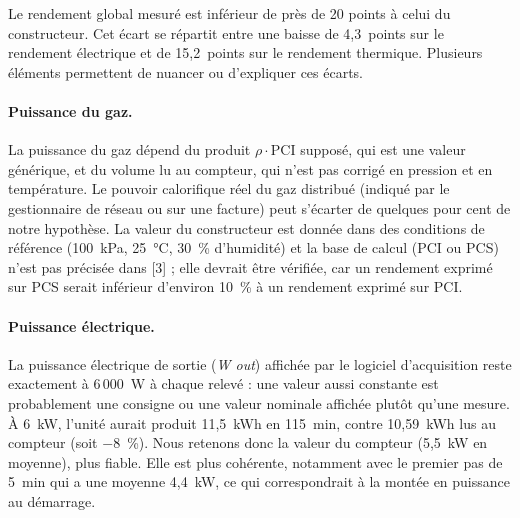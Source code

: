 Le rendement global mesuré est inférieur de près de 20 points à celui du
constructeur. Cet écart se répartit entre une baisse de 4,3~points sur
le rendement électrique et de 15,2~points sur le rendement thermique.
Plusieurs éléments permettent de nuancer ou d'expliquer ces écarts.

\paragraph{Puissance du gaz.} La puissance du gaz dépend du produit
$\rho \cdot \mathrm{PCI}$ supposé, qui est une valeur générique, et du
volume lu au compteur, qui n'est pas corrigé en pression et en
température. Le pouvoir calorifique réel du gaz distribué (indiqué par
le gestionnaire de réseau ou sur une facture) peut s'écarter de
quelques pour cent de notre hypothèse. La valeur du constructeur est donnée dans des conditions de
référence (100~kPa, 25~°C, 30~\% d'humidité) et la base de calcul
(PCI ou PCS) n'est pas précisée dans [3] ; elle devrait être vérifiée,
car un rendement exprimé sur PCS serait inférieur d'environ 10~\% à un
rendement exprimé sur PCI.

\paragraph{Puissance électrique.} La puissance électrique de sortie
(\emph{W out}) affichée par le logiciel d'acquisition reste exactement à 6\,000~W à chaque
relevé : une valeur aussi constante est probablement une consigne ou une
valeur nominale affichée plutôt qu'une mesure. À 6~kW, l'unité aurait
produit 11,5~kWh en 115~min, contre 10,59~kWh lus au compteur
(soit $-8$~\%). Nous retenons donc la valeur du
compteur (5,5~kW en moyenne), plus fiable. Elle est plus cohérente, notamment avec le
premier pas de 5~min qui a une moyenne 4,4~kW, ce qui correspondrait à la montée en puissance
au démarrage.

